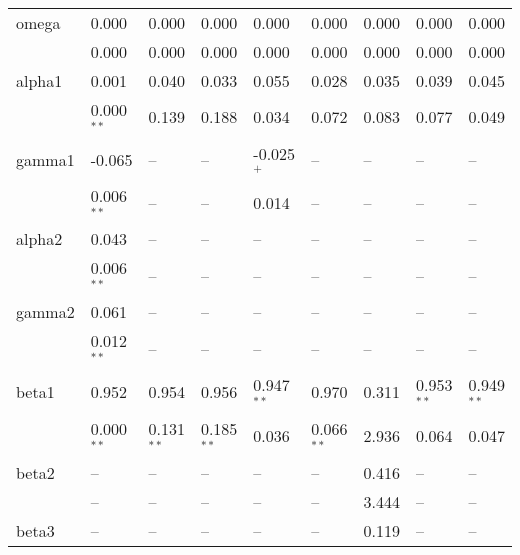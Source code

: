\documentclass[12pt]{article}
\begin{document}
\begin{table}
\begin{tabular}{l l l l l | l l l l}
        	omega  &  0.000        &  0.000        &  0.000        &  0.000        &  0.000        &  0.000        & 0.000        &  0.000        \\
        		   &  0.000        &  0.000        &  0.000        &  0.000        &  0.000        &  0.000        & 0.000        &  0.000        \\
        	alpha1 &  0.001        &  0.040        &  0.033        &  0.055        &  0.028        &  0.035        & 0.039        &  0.045        \\
        		   &  0.000$^{**}$ &  0.139        &  0.188        &  0.034        &  0.072        &  0.083        & 0.077        &  0.049        \\ 
        	gamma1 & -0.065        &     --        &     --        & -0.025$^{+}$  &     --        &     --        &    --        &     --        \\
        		   &  0.006$^{**}$ &     --        &     --        &  0.014        &     --        &     --        &    --        &     --        \\
        	alpha2 &  0.043        &     --        &     --        &     --        &     --        &     --        &    --        &     --        \\
        		   &  0.006$^{**}$ &     --        &     --        &     --        &     --        &     --        &    --        &     --        \\
        	gamma2 &  0.061        &     --        &     --        &     --        &     --        &     --        &    --        &     --        \\
        		   &  0.012$^{**}$ &     --        &     --        &     --        &     --        &     --        &    --        &     --        \\
        	beta1  &  0.952        &  0.954        &  0.956        &  0.947$^{**}$ &  0.970        &  0.311        & 0.953$^{**}$ &  0.949$^{**}$ \\
        		   &  0.000$^{**}$ &  0.131$^{**}$ &  0.185$^{**}$ &  0.036        &  0.066$^{**}$ &  2.936        & 0.064        &  0.047        \\
        	beta2  &     --        &     --        &     --        &     --        &     --        &  0.416        &    --        &     --        \\
        		   &     --        &     --        &     --        &     --        &     --        &  3.444        &    --        &     --        \\
        	beta3  &     --        &     --        &     --        &     --        &     --        &  0.119        &    --        &     --        \\

\end{tabular}
\end{table}
\end{document}
